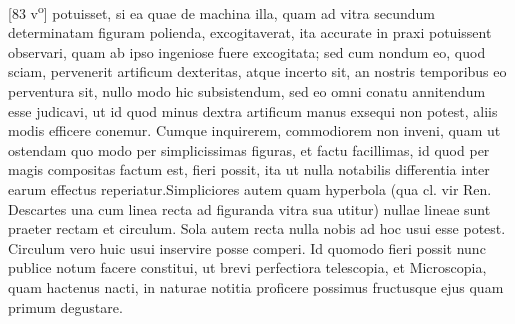 [83 v\textsuperscript{o}]  potuisset, si ea quae de machina illa, quam ad vitra secundum  determinatam figuram polienda, excogitaverat, ita accurate  in praxi potuissent observari, quam ab ipso ingeniose  fuere excogitata; sed cum nondum eo, quod sciam, pervenerit  artificum dexteritas, atque incerto sit, an nostris temporibus  eo perventura sit, nullo modo hic subsistendum, sed eo omni  conatu annitendum esse judicavi, ut id quod minus dextra  artificum manus exsequi non potest, aliis modis efficere  conemur. Cumque inquirerem, commodiorem non inveni,  quam ut ostendam quo modo per simplicissimas figuras,  et factu facillimas, id quod per magis compositas factum  est, fieri possit, ita ut nulla notabilis differentia inter  earum effectus reperiatur.\pend \pstart  Simpliciores autem quam hyperbola (qua cl. vir Ren. Descartes\protect{} una cum linea recta ad figuranda vitra sua  utitur) nullae lineae sunt praeter rectam et circulum.  Sola autem recta nulla nobis ad hoc usui esse potest. Circulum  vero huic usui inservire posse comperi. Id quomodo fieri possit  nunc publice notum facere constitui, ut brevi perfectiora telescopia\protect{}, et Microscopia\protect{}, quam hactenus nacti, in naturae  notitia proficere possimus fructusque ejus quam primum degustare. 